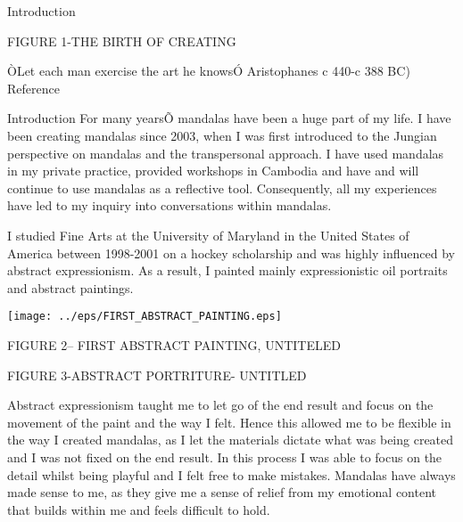 Introduction


FIGURE 1-THE BIRTH OF CREATING 


ÒLet each man exercise the art he knowsÓ Aristophanes c 440-c 388 BC) Reference

Introduction
For many yearsÕ mandalas have been a huge part of my life. I have been creating mandalas since 2003, when I was first introduced to the Jungian perspective on mandalas and the transpersonal approach. I have used mandalas in my private practice, provided workshops in Cambodia and have and will continue to use mandalas as a reflective tool. Consequently, all my experiences have led to my inquiry into conversations within mandalas. 

I studied Fine Arts at the University of Maryland in the United States of America between 1998-2001 on a hockey scholarship and was highly influenced by abstract expressionism. As a result, I painted mainly expressionistic oil portraits and abstract paintings.


\texttt{[image: ../eps/FIRST\_ABSTRACT\_PAINTING.eps]}


FIGURE 2-- FIRST ABSTRACT PAINTING, UNTITELED




FIGURE 3-ABSTRACT PORTRITURE- UNTITLED

Abstract expressionism taught me to let go of the end result and focus on the movement of the paint and the way I felt. Hence this allowed me to be flexible in the way I created mandalas, as I let the materials dictate what was being created and I was not fixed on the end result. In this process I was able to focus on the detail whilst being playful and I felt free to make mistakes. Mandalas have always made sense to me, as they give me a sense of relief from my emotional content that builds within me and feels difficult to hold.

